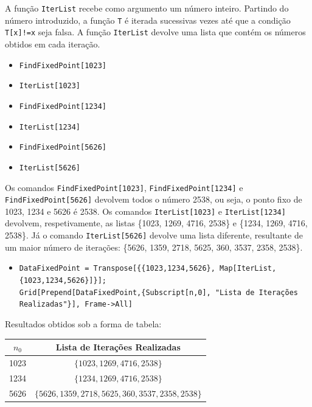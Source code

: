 \documentclass[12pt,a4paper]{article}
\begin{document}
        A função \texttt{IterList} recebe como argumento um número inteiro. Partindo do número introduzido, a função \texttt{T} é iterada sucessivas vezes até que a condição \texttt{T[x]!=x} seja falsa. A função \texttt{IterList} devolve uma lista que contém os números obtidos em cada iteração.

        \begin{itemize}
            \item \texttt{FindFixedPoint[1023]}
            \item \texttt{IterList[1023]}
            \item \texttt{FindFixedPoint[1234]}
            \item \texttt{IterList[1234]}
            \item \texttt{FindFixedPoint[5626]}
            \item \texttt{IterList[5626]}
        \end{itemize}
        
        Os comandos \texttt{FindFixedPoint[1023]}, \texttt{FindFixedPoint[1234]} e \texttt{FindFixedPoint[5626]} devolvem todos o número 2538, ou seja, o ponto fixo de 1023, 1234 e 5626 é 2538. Os comandos \texttt{IterList[1023]} e \texttt{IterList[1234]} devolvem, respetivamente, as listas \{1023, 1269, 4716, 2538\} e \{1234, 1269, 4716, 2538\}. Já o comando \texttt{IterList[5626]} devolve uma lista diferente, resultante de um maior número de iterações: \{5626, 1359, 2718, 5625, 360, 3537, 2358, 2538\}.

        \newpage
        \begin{itemize}
            \item \texttt{DataFixedPoint = Transpose[\{\{1023,1234,5626\}, Map[IterList,\{1023,1234,5626\}]\}]; \\ Grid[Prepend[DataFixedPoint,\{Subscript[n,0], "Lista de Iterações Realizadas"\}], Frame->All]}
        \end{itemize}
        
        Resultados obtidos sob a forma de tabela:
        \begin{table}[h!]
            \centering
            \begin{tabular}{|c|c|}
                \hline
                \(n_0\) & \textbf{Lista de Iterações Realizadas} \\
                \hline
                1023 & \(\{1023,1269,4716,2538\}\) \\
                1234 & \(\{1234,1269,4716,2538\}\) \\
                5626 & \(\{5626,1359,2718,5625,360,3537,2358,2538\}\) \\
                \hline
            \end{tabular}
        \end{table}
\end{document}

